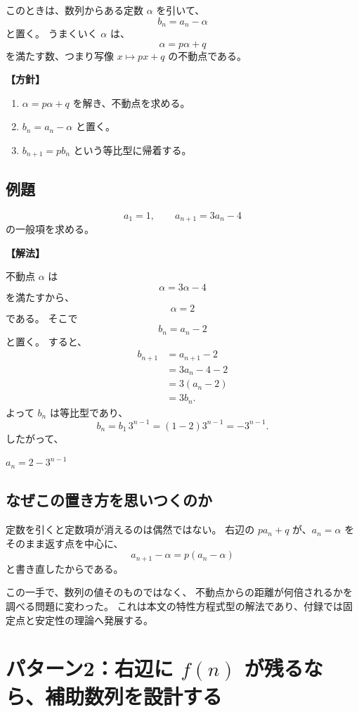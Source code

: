 このときは、数列からある定数 $\alpha$ を引いて、
\[
  b_n=a_n-\alpha
\]
と置く。
うまくいく $\alpha$ は、
\[
  \alpha=p\alpha+q
\]
を満たす数、つまり写像 $x\mapsto px+q$ の不動点である。

\noindent\textbf{【方針】}

\begin{enumerate}
  \item $\alpha=p\alpha+q$ を解き、不動点を求める。
  \item $b_n=a_n-\alpha$ と置く。
  \item $b_{n+1}=pb_n$ という等比型に帰着する。
\end{enumerate}

\subsection{例題}

\[
  a_1=1,\qquad a_{n+1}=3a_n-4
\]
の一般項を求める。

\noindent\textbf{【解法】}

不動点 $\alpha$ は
\[
  \alpha=3\alpha-4
\]
を満たすから、
\[
  \alpha=2
\]
である。
そこで
\[
  b_n=a_n-2
\]
と置く。
すると、
\[
  \begin{aligned}
    b_{n+1}
     & =a_{n+1}-2 \\
     & =3a_n-4-2  \\
     & =3(a_n-2)  \\
     & =3b_n.
  \end{aligned}
\]
よって $b_n$ は等比型であり、
\[
  b_n=b_1\,3^{n-1}=(1-2)3^{n-1}=-3^{n-1}.
\]
したがって、
\begin{mdquote}
  $a_n=2-3^{n-1}$
\end{mdquote}

\subsection{なぜこの置き方を思いつくのか}

定数を引くと定数項が消えるのは偶然ではない。
右辺の $pa_n+q$ が、$a_n=\alpha$ をそのまま返す点を中心に、
\[
  a_{n+1}-\alpha=p(a_n-\alpha)
\]
と書き直したからである。

この一手で、数列の値そのものではなく、
不動点からの距離が何倍されるかを調べる問題に変わった。
これは本文の特性方程式型の解法であり、付録では固定点と安定性の理論へ発展する。

\section{パターン2：右辺に $f(n)$ が残るなら、補助数列を設計する}

